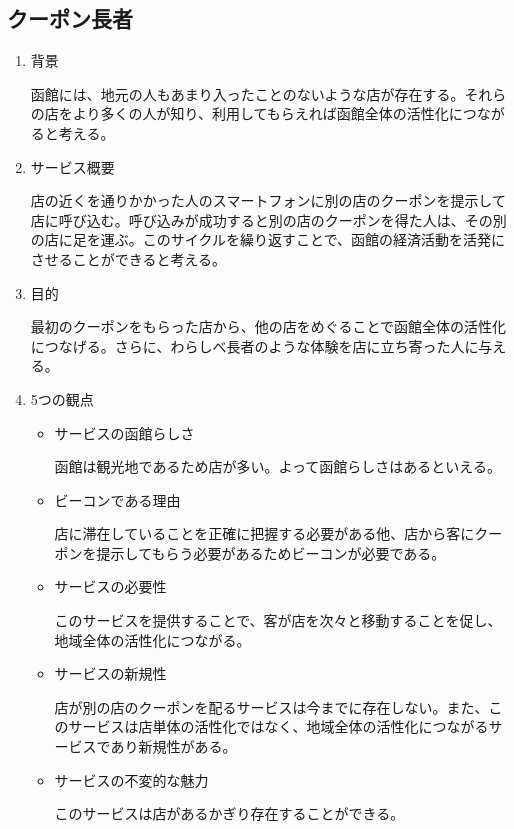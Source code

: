 \subsection{クーポン長者}
\begin{enumerate}
    \item 背景
    \par 函館には、地元の人もあまり入ったことのないような店が存在する。それらの店をより多くの人が知り、利用してもらえれば函館全体の活性化につながると考える。
    \item サービス概要
    \par 店の近くを通りかかった人のスマートフォンに別の店のクーポンを提示して店に呼び込む。呼び込みが成功すると別の店のクーポンを得た人は、その別の店に足を運ぶ。このサイクルを繰り返すことで、函館の経済活動を活発にさせることができると考える。
    \item 目的
    \par 最初のクーポンをもらった店から、他の店をめぐることで函館全体の活性化につなげる。さらに、わらしべ長者のような体験を店に立ち寄った人に与える。
    \item 5つの観点
    \begin{itemize}
        \item サービスの函館らしさ
        \par 函館は観光地であるため店が多い。よって函館らしさはあるといえる。
        \item ビーコンである理由
        \par 店に滞在していることを正確に把握する必要がある他、店から客にクーポンを提示してもらう必要があるためビーコンが必要である。
        \item サービスの必要性
        \par このサービスを提供することで、客が店を次々と移動することを促し、地域全体の活性化につながる。
        \item サービスの新規性
        \par 店が別の店のクーポンを配るサービスは今までに存在しない。また、このサービスは店単体の活性化ではなく、地域全体の活性化につながるサービスであり新規性がある。
        \item サービスの不変的な魅力
        \par このサービスは店があるかぎり存在することができる。
    \end{itemize}
\end{enumerate}

